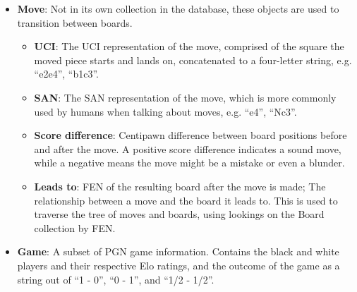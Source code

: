 \documentclass[architecture.tex]{subfiles}
\begin{document}
\begin{itemize}
    \item \textbf{Move}: Not in its own collection in the database, these
        objects are used to transition between boards.
        \begin{itemize}
            \item \textbf{UCI}: The UCI representation of the move, 
                comprised of the square the moved piece starts and lands on,
                concatenated to a four-letter string, e.g. ``e2e4'', ``b1c3''.
            \item \textbf{SAN}: The SAN representation of the move, which
                is more commonly used by humans when talking about moves,
                e.g. ``e4'', ``Nc3''. 
            \item \textbf{Score difference}:
                Centipawn difference between board positions before and after the move.
                A positive score difference indicates a sound move, while a negative
                means the move might be a mistake or even a blunder.
            \item \textbf{Leads to}: FEN of the resulting board after the move is made;
                The relationship between a move and the board it leads to.
                This is used to traverse the tree of moves and boards,
                using lookings on the Board collection by FEN.
        \end{itemize}
    \item \textbf{Game}: A subset of PGN game information. Contains the black
        and white players and their respective Elo ratings, and the outcome
        of the game as a string out of ``1 - 0'', ``0 - 1'', and ``1/2 - 1/2''.
\end{itemize}
\end{document}
